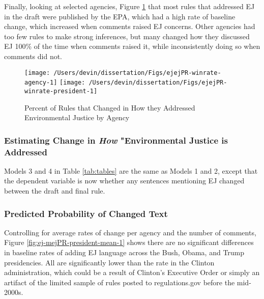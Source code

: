 \documentclass[
      12pt,
        ]{article}
\begin{document}
Finally, looking at selected agencies, Figure \ref{fig:ejejPR-winrate-2} that most rules that addressed EJ in the draft were published by the EPA, which had a high rate of baseline change, which increased when comments raised EJ concerns. Other agencies had too few rules to make strong inferences, but many changed how they discussed EJ 100\% of the time when comments raised it, while inconsistently doing so when comments did not.

\begin{figure}

{\centering \texttt{[image: /Users/devin/dissertation/Figs/ejejPR-winrate-agency-1]} \texttt{[image: /Users/devin/dissertation/Figs/ejejPR-winrate-president-1]} 

}

\caption{Percent of Rules that Changed in How they Addressed Environmental Justice by Agency}\label{fig:ejejPR-winrate-2}
\end{figure}

\hypertarget{estimating-change-in-how-environmental-justice-is-addressed}{%
\subsubsection{\texorpdfstring{Estimating Change in \emph{How} "Environmental Justice is Addressed}{Estimating Change in How "Environmental Justice is Addressed}}\label{estimating-change-in-how-environmental-justice-is-addressed}}

Models 3 and 4 in Table \ref{tab:tables} are the same as Models 1 and 2, except that the dependent variable is now whether any sentences mentioning EJ changed between the draft and final rule.

\hypertarget{predicted-probability-of-changed-text}{%
\subsubsection{Predicted Probability of Changed Text}\label{predicted-probability-of-changed-text}}

Controlling for average rates of change per agency and the number of comments, Figure \ref{fig:ej-mejPR-president-mean-1} shows there are no significant differences in baseline rates of adding EJ language across the Bush, Obama, and Trump presidencies. All are significantly lower than the rate in the Clinton administration, which could be a result of Clinton's Executive Order or simply an artifact of the limited sample of rules posted to regulations.gov before the mid-2000s.
\end{document}
